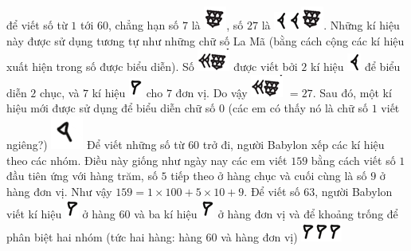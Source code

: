 	để viết số từ $1$ tới $60$, chẳng hạn số $7$ là  \includegraphics[scale=0.75]{17}, số $27$ là  \includegraphics[scale=0.75]{16}\includegraphics[scale=0.75]{16}\includegraphics[scale=0.75]{17}. 	 
	\vskip 0.1cm
	Những kí hiệu này được sử dụng tương tự như những chữ số La Mã (bằng cách cộng các kí hiệu xuất hiện trong số được biểu diễn). Số \includegraphics[scale=0.75]{18} được viết bởi $2$ kí hiệu \includegraphics[scale=0.75]{16} để biểu diễn $2$ chục, và $7$ kí hiệu \includegraphics[scale=0.75]{15}  cho $7$ đơn vị. Do vậy \includegraphics[scale=0.75]{18}  $=27$.
	\vskip 0.1cm
	Sau đó, một kí hiệu mới được sử dụng để biểu diễn chữ số $0$ (các em có thấy nó là chữ số $1$ viết ngiêng?)
	\includegraphics[scale=0.75]{15.1}
	\vskip 0.1cm
	Để viết những số từ $60$ trở đi, người Babylon xếp các kí hiệu theo các nhóm. Điều này giống như ngày nay các em viết $159$ bằng cách viết số $1$ đầu tiên ứng với hàng trăm, số $5$ tiếp theo ở hàng chục và cuối cùng là số $9$ ở hàng đơn vị. Như vậy $159 = 1 \times 100+ 5 \times 10+ 9$.
	\vskip 0.1cm
	Để viết số $63$, người Babylon viết kí hiệu  \includegraphics[scale=0.85]{15}  ở hàng $60$ và ba kí hiệu \includegraphics[scale=0.85]{15}  ở hàng đơn vị và để khoảng trống để phân biệt hai nhóm (tức hai hàng: hàng $60$ và hàng đơn vị) \includegraphics[scale=0.85]{15}\includegraphics[scale=0.85]{15}\includegraphics[scale=0.85]{15}
